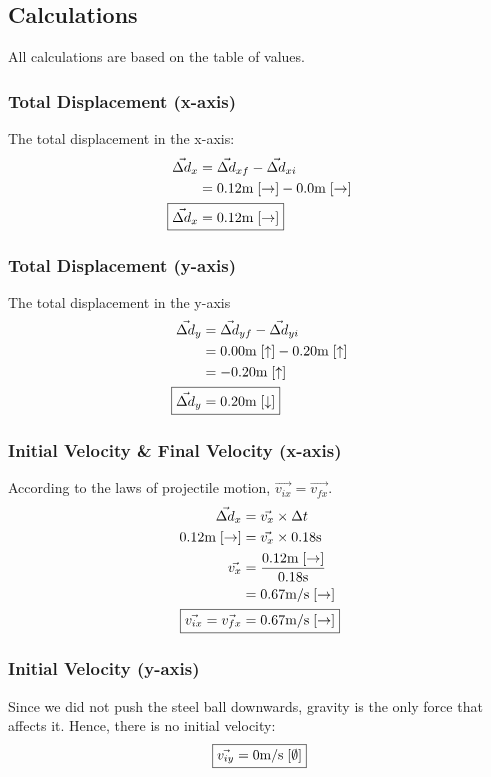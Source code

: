\documentclass[a4paper,12pt]{article}
\begin{document}
	\newpage
	
	\subsection{Calculations}
	All calculations are based on the table of values. 
	\subsubsection{Total Displacement (x-axis)}
	The total displacement in the x-axis:
	\begin{align*}
		\vec{\Delta d}_x&=\vec{\Delta d}_{xf}-\vec{\Delta d}_{xi}\\
		&=0.12 \text{m}\;[\rightarrow]-0.0 \text{m}\; [\rightarrow]\\
		\Aboxed{\vec{\Delta d}_x&=0.12\text{m}\; [\rightarrow]}
	\end{align*}
	\subsubsection{Total Displacement (y-axis)}
	The total displacement in the y-axis
	\begin{align*}
		\vec{\Delta d}_y&=\vec{\Delta d}_{yf}-\vec{\Delta d}_{yi}\\
		&=0.00 \text{m}\; [\uparrow]-0.20 \text{m}\; [\uparrow]\\
		&=-0.20\text{m}\; [\uparrow]\\
		\Aboxed{\vec{\Delta d}_y&=0.20\text{m}\; [\downarrow]}
	\end{align*}
	\subsubsection{Initial Velocity \& Final Velocity (x-axis)}
	According to the laws of projectile motion, $\vec{v_{ix}}=\vec{v_{fx}}$.
	\begin{align*}
		\vec{\Delta d}_x&=\vec{v_x}\times \Delta t\\
		0.12\text{m}\; [\rightarrow]&=\vec{v_x} \times 0.18\text{s}\\
		\vec{v_x}&=\frac{0.12\text{m}\; [\rightarrow]}{0.18\text{s}}\\
		      &=0.67\text{m}/\text{s}\;[\rightarrow]\\
		\Aboxed{\vec{v_{ix}}=\vec{v_{fx}}&=0.67\text{m}/\text{s}\;[\rightarrow]}
	\end{align*}
	\subsubsection{Initial Velocity (y-axis)}
	Since we did not push the steel ball downwards, gravity is the only force that affects it. Hence, there is no initial velocity:
	\begin{align*}
		\Aboxed{\vec{v_{iy}}&=0\text{m}/\text{s}\;[\emptyset]}\\
	\end{align*}
\end{document}

